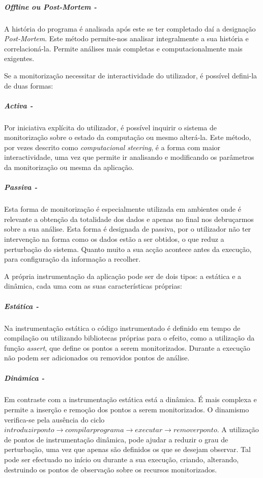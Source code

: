 \subparagraph*{Offline ou \textit{Post-Mortem} - }

A história do programa é analisada após este se ter completado daí a designação \textit{Post-Mortem}.
Este método permite-nos analisar integralmente a sua história e correlacioná-la.
Permite análises mais completas e computacionalmente mais exigentes.

Se a monitorização necessitar de interactividade do utilizador, é possível defini-la de duas formas:

\subparagraph*{Activa - }

Por iniciativa explícita do utilizador, é possível inquirir o sistema de monitorização sobre o estado da computação ou mesmo alterá-la.
Este método, por vezes descrito como \textit{computacional steering}, é a forma com maior interactividade, uma vez que permite ir analisando e modificando os parâmetros da monitorização ou mesma da aplicação.

\subparagraph*{Passiva - }
Esta forma de monitorização é especialmente utilizada em ambientes onde é relevante a obtenção da totalidade dos dados e apenas no final nos debruçarmos sobre a sua análise.
Esta forma é designada de passiva, por o utilizador não ter intervenção na forma como os dados estão a ser obtidos, o que reduz a perturbação do sistema.
Quanto muito a sua acção acontece antes da execução, para configuração da informação a recolher.

A própria instrumentação da aplicação pode ser de dois tipos: a estática e a dinâmica, cada uma com as suas características próprias:

\subparagraph*{Estática - }

Na instrumentação estática o código instrumentado é definido em tempo de compilação ou utilizando bibliotecas próprias para o efeito, como a utilização da função \textit{assert}, que define os pontos a serem monitorizados.
Durante a execução não podem ser adicionados ou removidos pontos de análise.

\subparagraph*{Dinâmica - }

Em contraste com a instrumentação estática está a dinâmica.
É mais complexa e permite a inserção e remoção dos pontos a serem monitorizados.
O dinamismo verifica-se pela ausência do ciclo $introduzir ponto\rightarrow compilar programa\rightarrow executar\rightarrow remover ponto$.
A utilização de pontos de instrumentação dinâmica, pode ajudar a reduzir o grau de perturbação, uma vez que apenas são definidos os que se desejam observar.
Tal pode ser efectuado no início ou durante a sua execução, criando, alterando, destruindo os pontos de observação sobre os recursos monitorizados.


